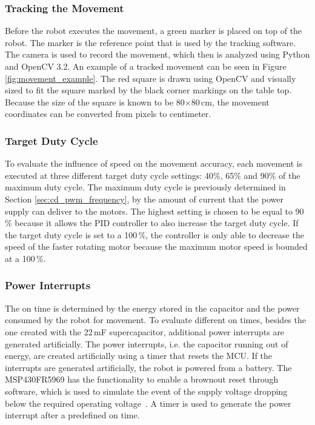 \subsubsection{Tracking the Movement}

Before the robot executes the movement, a green marker is placed on top of the robot.
The marker is the reference point that is used by the tracking software.
The camera is used to record the movement, which then is analyzed using Python and OpenCV 3.2.
An example of a tracked movement can be seen in Figure \ref{fig:movement_example}.
The red square is drawn using OpenCV and visually sized to fit the square marked by the black corner markings on the table top.
Because the size of the square is known to be 80$\times$80\,cm, the movement coordinates can be converted from pixels to centimeter.

\subsubsection{Target Duty Cycle}
To evaluate the influence of speed on the movement accuracy, each movement is executed at three different target duty cycle settings: 40\%, 65\% and 90\% of the maximum duty cycle.
The maximum duty cycle is previously determined in Section \ref{sec:cd_pwm_frequency}, by the amount of current that the power supply can deliver to the motors.
The highest setting is chosen to be equal to 90\,\% because it allows the PID controller to also increase the target duty cycle.
If the target duty cycle is set to a 100\,\%, the controller is only able to decrease the speed of the faster rotating motor because the maximum motor speed is bounded at a 100\,\%.

\subsubsection{Power Interrupts}

The on time is determined by the energy stored in the capacitor and the power consumed by the robot for movement.
To evaluate different on times, besides the one created with the 22\,mF supercapacitor, additional power interrupts are generated artificially.
The power interrupts, i.e. the capacitor running out of energy, are created artificially using a timer that resets the MCU.
If the interrupts are generated artificially, the robot is powered from a battery.
The MSP430FR5969 has the functionality to enable a brownout reset through software, which is used to simulate the event of the supply voltage dropping below the required operating voltage~\cite{msp430fr_family_guide_2017}.
A timer is used to generate the power interrupt after a predefined on time.

